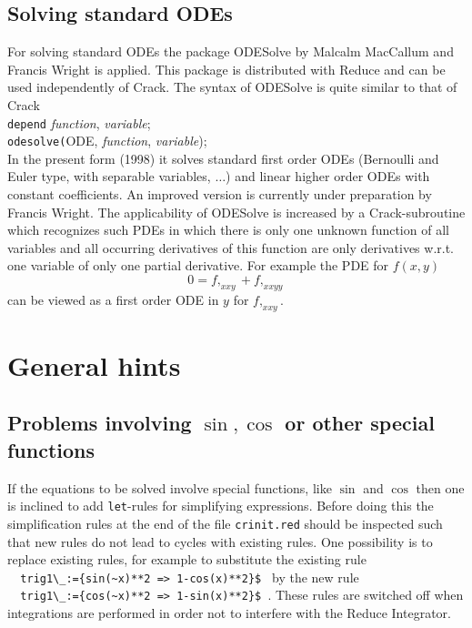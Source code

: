 \documentclass[12pt]{article}
\begin{document}
\subsection{Solving standard ODEs}
For solving standard ODEs the package {\sc ODESolve} by Malcalm MacCallum and
Francis Wright  
\cite{Mal} is applied. This package is distributed with {\sc Reduce} 
and can be used independently of {\sc Crack}. The syntax of
{\sc ODESolve} is quite similar to that of {\sc Crack} \\
\verb+depend+ {\it function}, {\it variable}; \\
\verb+odesolve(+ODE, {\it function}, {\it variable});  \\
In the present form (1998) it solves standard first order ODEs
(Bernoulli and Euler type, with separable variables, $\ldots$) and linear
higher order ODEs with constant coefficients. 
An improved version is currently under preparation by Francis Wright.
The applicability of {\sc ODESolve} is 
increased by a {\sc Crack}-subroutine which recognizes such PDEs in which
there is only one unknown function of all variables and all occurring
derivatives of this function
are only derivatives w.r.t. one variable of only one partial derivative.
For example the PDE for $f(x,y)$
\[ 0 = f,_{xxy} + f,_{xxyy} \]
can be viewed as a first order ODE in $y$ for $f,_{xxy}.$

\section{General hints}
\subsection{Problems involving $\sin, \cos$ or other special functions}
If the equations to be solved involve special functions, like $\sin$
and $\cos$ then one is inclined to add {\tt let}-rules for simplifying
expressions. Before doing this the simplification rules at the end of
the file {\tt crinit.red} should be inspected such that new rules do
not lead to cycles with existing rules. One possibility is to replace
existing rules, for example to substitute the existing rule \\
\verb+  trig1\_:={sin(~x)**2 => 1-cos(x)**2}$ + by the new rule \\
\verb+  trig1\_:={cos(~x)**2 => 1-sin(x)**2}$ +.
These rules are switched off when integrations are performed in order
not to interfere with the {\sc Reduce} Integrator.
\end{document}
